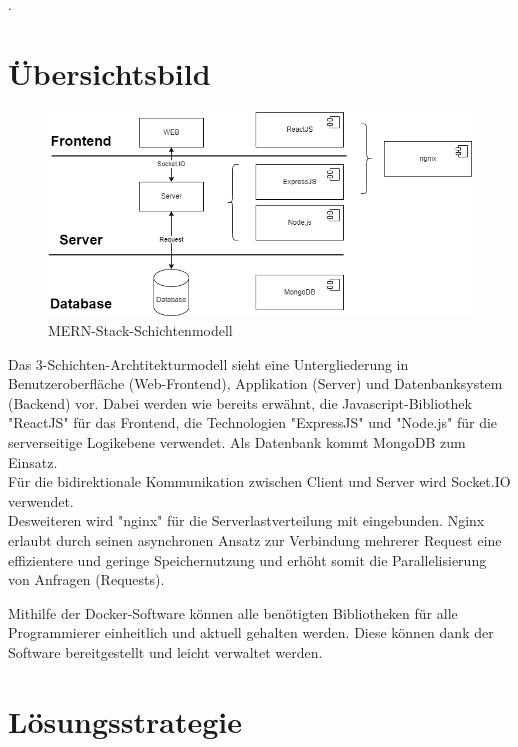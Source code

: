 \documentclass[conference]{IEEEtran}
\begin{document}
\begin{itemize}
\begin{itemize}
\end{itemize}
.

\section{Übersichtsbild}



\begin{figure}[htbp]
\centering
\includegraphics[scale=0.35]{MERN.png}
\caption{MERN-Stack-Schichtenmodell}%
\end{figure}
\begin{itemize}
Das 3-Schichten-Archtitekturmodell sieht eine Untergliederung in Benutzeroberfläche (Web-Frontend), Applikation (Server) und Datenbanksystem (Backend) vor. Dabei werden wie bereits erwähnt, die Javascript-Bibliothek "ReactJS" für das Frontend, die Technologien "ExpressJS" und "Node.js" für die serverseitige Logikebene verwendet. Als Datenbank kommt MongoDB zum Einsatz.
\\
Für die bidirektionale Kommunikation zwischen Client und Server wird Socket.IO verwendet.
\\
Desweiteren wird "nginx" für die Serverlastverteilung mit eingebunden. Nginx erlaubt durch seinen asynchronen Ansatz zur Verbindung mehrerer Request eine effizientere und geringe Speichernutzung und erhöht somit die Parallelisierung von Anfragen (Requests).

Mithilfe der Docker-Software können alle benötigten  Bibliotheken für alle Programmierer einheitlich und aktuell gehalten werden. Diese können dank der Software bereitgestellt und leicht verwaltet werden.

\end{itemize}

\section{Lösungsstrategie}


\end{itemize}
\end{document}

